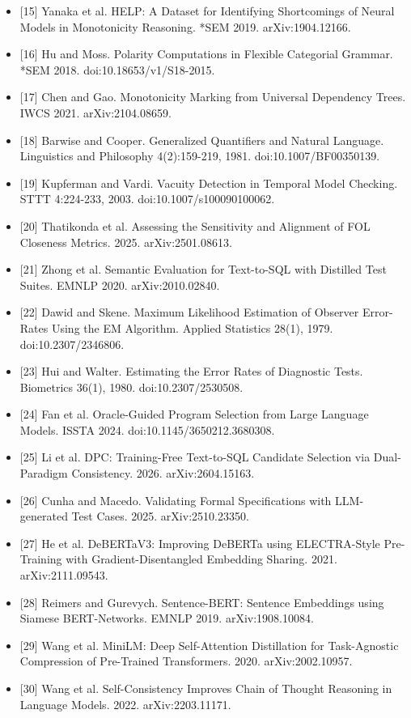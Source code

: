 \documentclass[11pt,letterpaper]{article}
\begin{document}
\begin{itemize}
\item {}[15] Yanaka et al. HELP: A Dataset for Identifying Shortcomings of Neural Models in Monotonicity Reasoning. *SEM 2019. arXiv:1904.12166.
\item {}[16] Hu and Moss. Polarity Computations in Flexible Categorial Grammar. *SEM 2018. doi:10.18653/v1/S18-2015.
\item {}[17] Chen and Gao. Monotonicity Marking from Universal Dependency Trees. IWCS 2021. arXiv:2104.08659.
\item {}[18] Barwise and Cooper. Generalized Quantifiers and Natural Language. Linguistics and Philosophy 4(2):159-219, 1981. doi:10.1007/BF00350139.
\item {}[19] Kupferman and Vardi. Vacuity Detection in Temporal Model Checking. STTT 4:224-233, 2003. doi:10.1007/s100090100062.
\item {}[20] Thatikonda et al. Assessing the Sensitivity and Alignment of FOL Closeness Metrics. 2025. arXiv:2501.08613.
\item {}[21] Zhong et al. Semantic Evaluation for Text-to-SQL with Distilled Test Suites. EMNLP 2020. arXiv:2010.02840.
\item {}[22] Dawid and Skene. Maximum Likelihood Estimation of Observer Error-Rates Using the EM Algorithm. Applied Statistics 28(1), 1979. doi:10.2307/2346806.
\item {}[23] Hui and Walter. Estimating the Error Rates of Diagnostic Tests. Biometrics 36(1), 1980. doi:10.2307/2530508.
\item {}[24] Fan et al. Oracle-Guided Program Selection from Large Language Models. ISSTA 2024. doi:10.1145/3650212.3680308.
\item {}[25] Li et al. DPC: Training-Free Text-to-SQL Candidate Selection via Dual-Paradigm Consistency. 2026. arXiv:2604.15163.
\item {}[26] Cunha and Macedo. Validating Formal Specifications with LLM-generated Test Cases. 2025. arXiv:2510.23350.
\item {}[27] He et al. DeBERTaV3: Improving DeBERTa using ELECTRA-Style Pre-Training with Gradient-Disentangled Embedding Sharing. 2021. arXiv:2111.09543.
\item {}[28] Reimers and Gurevych. Sentence-BERT: Sentence Embeddings using Siamese BERT-Networks. EMNLP 2019. arXiv:1908.10084.
\item {}[29] Wang et al. MiniLM: Deep Self-Attention Distillation for Task-Agnostic Compression of Pre-Trained Transformers. 2020. arXiv:2002.10957.
\item {}[30] Wang et al. Self-Consistency Improves Chain of Thought Reasoning in Language Models. 2022. arXiv:2203.11171.

\end{itemize}
\end{document}
